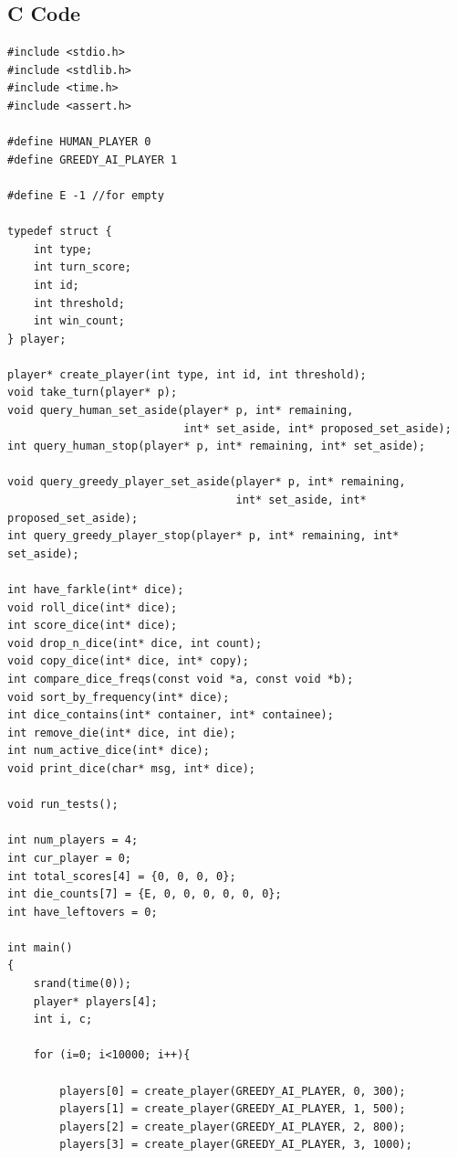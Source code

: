 \documentclass{article}
\begin{document}
\subsection{C Code}

\lstset{language=C,numbers=left,showspaces=false,showstringspaces=false,basicstyle=\footnotesize,numberstyle=\footnotesize}

\begin{lstlisting}
#include <stdio.h>
#include <stdlib.h>
#include <time.h>
#include <assert.h>

#define HUMAN_PLAYER 0
#define GREEDY_AI_PLAYER 1

#define E -1 //for empty

typedef struct {
    int type;
    int turn_score;
    int id;
    int threshold;
    int win_count;
} player;

player* create_player(int type, int id, int threshold);
void take_turn(player* p);
void query_human_set_aside(player* p, int* remaining,
                           int* set_aside, int* proposed_set_aside);
int query_human_stop(player* p, int* remaining, int* set_aside);

void query_greedy_player_set_aside(player* p, int* remaining,
                                   int* set_aside, int* proposed_set_aside);
int query_greedy_player_stop(player* p, int* remaining, int* set_aside);

int have_farkle(int* dice);
void roll_dice(int* dice);
int score_dice(int* dice);
void drop_n_dice(int* dice, int count);
void copy_dice(int* dice, int* copy);
int compare_dice_freqs(const void *a, const void *b);
void sort_by_frequency(int* dice);
int dice_contains(int* container, int* containee);
int remove_die(int* dice, int die);
int num_active_dice(int* dice);
void print_dice(char* msg, int* dice);

void run_tests();

int num_players = 4;
int cur_player = 0;
int total_scores[4] = {0, 0, 0, 0};
int die_counts[7] = {E, 0, 0, 0, 0, 0, 0};
int have_leftovers = 0;

int main()
{
    srand(time(0));
    player* players[4];
    int i, c;

    for (i=0; i<10000; i++){

        players[0] = create_player(GREEDY_AI_PLAYER, 0, 300);
        players[1] = create_player(GREEDY_AI_PLAYER, 1, 500);
        players[2] = create_player(GREEDY_AI_PLAYER, 2, 800);
        players[3] = create_player(GREEDY_AI_PLAYER, 3, 1000);


\end{lstlisting}
\end{document}
